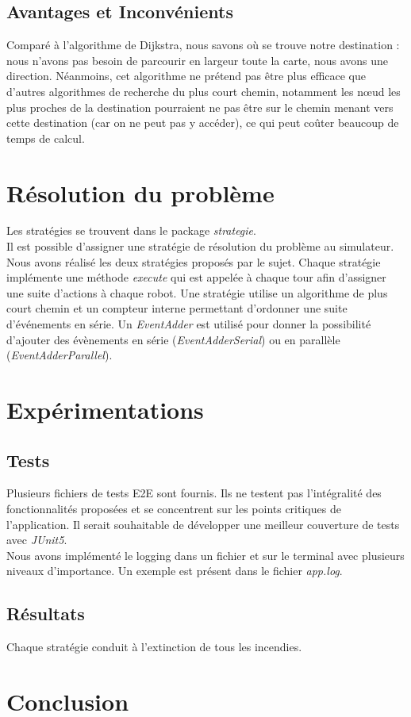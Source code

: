 \documentclass[a4paper, 10pt, french]{article}
\begin{document}
	\subsection{Avantages et Inconvénients}

	Comparé à l'algorithme de Dijkstra, nous savons où se trouve notre destination : nous n'avons pas besoin de parcourir en largeur toute la carte, nous avons une direction. Néanmoins, cet algorithme ne prétend pas être plus efficace que d'autres algorithmes de recherche du plus court chemin, notamment les nœud les plus proches de la destination pourraient ne pas être sur le chemin menant vers cette destination (car on ne peut pas y accéder), ce qui peut coûter beaucoup de temps de calcul.

\section{Résolution du problème}
	\noindent Les stratégies se trouvent dans le package {\it strategie}. \\

	Il est possible d'assigner une stratégie de résolution du problème au simulateur. Nous avons réalisé les deux stratégies proposés par le sujet. Chaque stratégie implémente une méthode {\it execute} qui est appelée à chaque tour afin d'assigner une suite d'actions à chaque robot. Une stratégie utilise un algorithme de plus court chemin et un compteur interne permettant d'ordonner une suite d'événements en série. Un {\it EventAdder} est utilisé pour donner la possibilité d'ajouter des évènements en série ({\it EventAdderSerial}) ou en parallèle ({\it EventAdderParallel}).

\section{Expérimentations}

	\subsection{Tests}
	Plusieurs fichiers de tests E2E sont fournis. Ils ne testent pas l'intégralité des fonctionnalités proposées et se concentrent sur les points critiques de l'application. Il serait souhaitable de développer une meilleur couverture de tests avec {\it JUnit5}. \\

	Nous avons implémenté le logging dans un fichier et sur le terminal avec plusieurs niveaux d'importance. Un exemple est présent dans le fichier {\it app.log}.

	\subsection{Résultats}
	Chaque stratégie conduit à l'extinction de tous les incendies.

\section{Conclusion}
\end{document}

